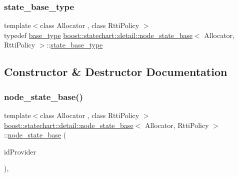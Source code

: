 \subsubsection{\texorpdfstring{state\+\_\+base\+\_\+type}{state\_base\_type}}
{\footnotesize\ttfamily template$<$class Allocator , class Rtti\+Policy $>$ \\
typedef \mbox{\hyperlink{classboost_1_1statechart_1_1detail_1_1node__state__base_a6a4897d400d9fb49ee9a7dac1f6c6f58}{base\+\_\+type}} \mbox{\hyperlink{classboost_1_1statechart_1_1detail_1_1node__state__base}{boost\+::statechart\+::detail\+::node\+\_\+state\+\_\+base}}$<$ Allocator, Rtti\+Policy $>$\+::\mbox{\hyperlink{classboost_1_1statechart_1_1detail_1_1node__state__base_a2b7ddb7642a5452045d9448444426735}{state\+\_\+base\+\_\+type}}}



\subsection{Constructor \& Destructor Documentation}
\mbox{\label{classboost_1_1statechart_1_1detail_1_1node__state__base_a3b2743a458153bb73abe1fe9f265ba74}} 
\subsubsection{\texorpdfstring{node\+\_\+state\+\_\+base()}{node\_state\_base()}}
{\footnotesize\ttfamily template$<$class Allocator , class Rtti\+Policy $>$ \\
\mbox{\hyperlink{classboost_1_1statechart_1_1detail_1_1node__state__base}{boost\+::statechart\+::detail\+::node\+\_\+state\+\_\+base}}$<$ Allocator, Rtti\+Policy $>$\+::\mbox{\hyperlink{classboost_1_1statechart_1_1detail_1_1node__state__base}{node\+\_\+state\+\_\+base}} (\begin{DoxyParamCaption}\item[{typename Rtti\+Policy\+::id\+\_\+provider\+\_\+type}]{id\+Provider }\end{DoxyParamCaption})\hspace{0.3cm}{\ttfamily [inline]}, {\ttfamily [protected]}}

